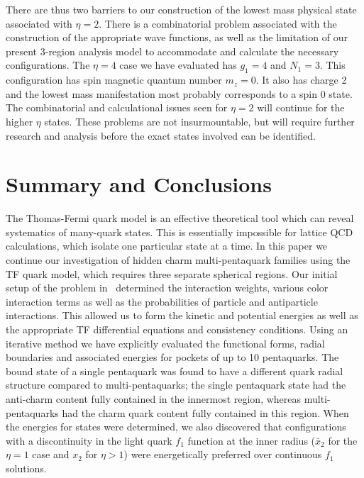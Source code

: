 \documentclass[final,3p,times,twocolumn]{elsarticle}
\begin{document}
    There are thus two barriers to our construction of the lowest mass physical state associated with $\eta=2$. There is a combinatorial problem associated with the construction of the appropriate wave functions, as well as the limitation of our present 3-region analysis model to accommodate and calculate the necessary configurations. The $\eta=4$ case we have evaluated has $g_1=4$ and $N_1=3$. This configuration has spin magnetic quantum number $m_z=0$. It also has charge 2 and the lowest mass manifestation most probably corresponds to a spin 0 state. The combinatorial and calculational issues seen for $\eta=2$ will continue for the higher $\eta$ states. These problems are not insurmountable, but will require further research and analysis before the exact states involved can be identified.
    

\section{Summary and Conclusions}

The Thomas-Fermi quark model is an effective theoretical tool which can reveal systematics of many-quark states. This is essentially impossible for lattice QCD calculations, which isolate one particular state at a time. In this paper we continue our investigation of hidden charm multi-pentaquark families using the TF quark model, which requires three separate spherical regions. Our initial setup of the problem in~\cite{giri2021investigation} determined the interaction weights, various color interaction terms as well as the probabilities of particle and antiparticle interactions. This allowed us to form the kinetic and potential energies as well as the appropriate TF differential equations and consistency conditions. Using an iterative method we have explicitly evaluated the functional forms, radial boundaries and associated energies for pockets of up to 10 pentaquarks. The bound state of a single pentaquark was found to have a different quark radial structure compared to multi-pentaquarks; the single pentaquark state had the anti-charm content fully contained in the innermost region, whereas multi-pentaquarks had the charm quark content fully contained in this region. When the energies for states were determined, we also discovered that configurations with a discontinuity in the light quark $f_1$ function at the inner radius ($\bar{x}_2$ for the $\eta = 1$ case and $x_2$ for $\eta> 1$) were energetically preferred over continuous $f_1$ solutions.
\end{document}
